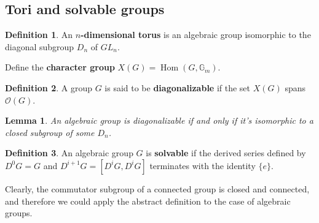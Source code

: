\documentclass[12pt]{report}
\newtheorem{lemma}{Lemma}[section]
\theoremstyle{remark}
\theoremstyle{definition}
\newtheorem{definition}{Definition}[section]
\newcommand{\G}[0]{\mathbb{G}}
\newcommand{\Hom}[0]{\operatorname{Hom}}
\begin{document}
    \subsection{Tori and solvable groups}
    \begin{definition}
        An \textbf{$n$-dimensional torus} is an algebraic group isomorphic to the diagonal subgroup $D_n$ of $GL_n$.
    \end{definition}
    Define the \textbf{character group} $X(G)=\Hom(G, \G_m)$.
    \begin{definition}
        A group $G$ is said to be \textbf{diagonalizable} if the set $X(G)$ spans $\mathcal O(G)$.
    \end{definition}
    \begin{lemma}
        An algebraic group is diagonalizable if and only if it's isomorphic to a closed subgroup of some $D_n$.
    \end{lemma}
    \begin{definition}
        An algebraic group $G$ is \textbf{solvable} if the derived series defined by $D^0G=G$ and $D^{i+1}G=[D^iG,D^iG]$ terminates with the identity $\{e\}$. 
    \end{definition}
    Clearly, the commutator subgroup of a connected group is closed and connected, and therefore we could apply the abstract definition to the case of algebraic groups.
\end{document}
